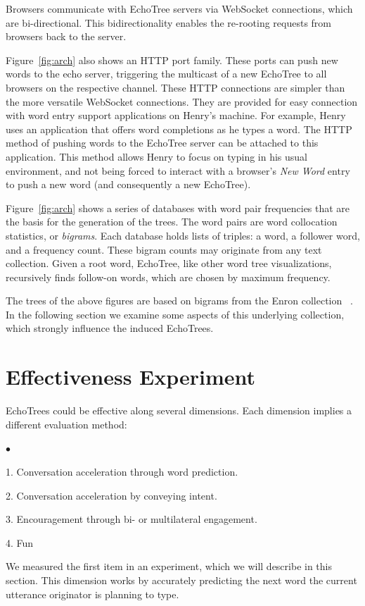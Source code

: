 \documentclass{sigchi}
\newcommand{\squishlist}{
 \begin{list}{$\bullet$}
 {
  \setlength{\itemsep}{0pt}
  \setlength{\parsep}{3pt}
  \setlength{\topsep}{3pt}
  \setlength{\partopsep}{0pt}
  \setlength{\leftmargin}{1.5em}
  \setlength{\labelwidth}{1em}
  \setlength{\labelsep}{0.5em} } }
\newcommand{\squishend}{
  \end{list}  }
\begin{document}
Browsers communicate with EchoTree servers via WebSocket connections,
which are bi-directional. This bidirectionality enables the re-rooting
requests from browsers back to the server.

Figure~\ref{fig:arch} also shows an HTTP port family. These ports can
push new words to the echo server, triggering the multicast of a new
EchoTree to all browsers on the respective channel. These HTTP
connections are simpler than the more versatile WebSocket
connections. They are provided for easy connection with word entry
support applications on Henry's machine. For example, Henry uses an
application that offers word completions as he types a word. The HTTP
method of pushing words to the EchoTree server can be attached to this
application. This method allows Henry to focus on typing in his usual
environment, and not being forced to interact with a browser's {\em
  New Word} entry to push a new word (and consequently a new
EchoTree).

Figure~\ref{fig:arch} shows a series of databases with word pair
frequencies that are the basis for the generation of the trees. The
word pairs are word collocation statistics, or {\em bigrams}.  Each
database holds lists of triples: a word, a follower word, and a
frequency count. These bigram counts may originate from any text
collection. Given a root word, EchoTree, like other word tree
visualizations, recursively finds follow-on words, which are chosen by
maximum frequency.

The trees of the above figures are based on bigrams from the Enron
collection ~\cite{enron}. In the following section we examine some
aspects of this underlying collection, which strongly influence the
induced EchoTrees.

\section{Effectiveness Experiment}
EchoTrees could be effective along several dimensions. Each dimension
implies a different evaluation method:
\squishlist
\item[1.] Conversation acceleration through word prediction.
\item[2.] Conversation acceleration by conveying intent.
\item[3.] Encouragement through bi- or multilateral engagement.
\item[4.] Fun
\squishend
We measured the first item in an experiment, which we will describe in
this section. This dimension works by accurately predicting the next
word the current utterance originator is planning to type.
\end{document}
